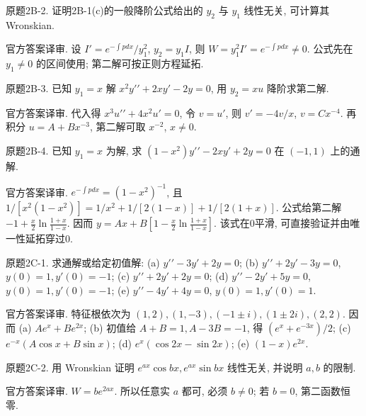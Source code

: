 \begin{exercise}\label{cw:bank-2B-2}
原题2B-2. 证明2B-1(c)的一般降阶公式给出的 $y_2$ 与 $y_1$ 线性无关, 可计算其 Wronskian.
\end{exercise}
\begin{solution}
官方答案译审. 设 $I\prime=e^{-\int p dx}/y_1^2$, $y_2=y_1I$, 则 $W=y_1^2I\prime=e^{-\int p dx}\ne0$. 公式先在 $y_1\ne0$ 的区间使用; 第二解可按正则方程延拓.
\end{solution}
\begin{exercise}\label{cw:bank-2B-3}
原题2B-3. 已知 $y_1=x$ 解 $x^2y\prime\prime+2xy\prime-2y=0$, 用 $y_2=xu$ 降阶求第二解.
\end{exercise}
\begin{solution}
官方答案译审. 代入得 $x^3u\prime\prime+4x^2u\prime=0$, 令 $v=u\prime$, 则 $v\prime=-4v/x$, $v=Cx^{-4}$. 再积分 $u=A+Bx^{-3}$, 第二解可取 $x^{-2}$, $x\ne0$.
\end{solution}
\begin{exercise}\label{cw:bank-2B-4}
原题2B-4. 已知 $y_1=x$ 为解, 求 $(1-x^2)y\prime\prime-2xy\prime+2y=0$ 在 $(-1,1)$ 上的通解.
\end{exercise}
\begin{solution}
官方答案译审. $e^{-\int p dx}=(1-x^2)^{-1}$, 且 $1/[x^2(1-x^2)]=1/x^2+1/[2(1-x)]+1/[2(1+x)]$. 公式给第二解 $-1+\frac{x}{2}\ln\frac{1+x}{1-x}$. 因而 $y=Ax+B[1-\frac{x}{2}\ln\frac{1+x}{1-x}]$. 该式在0平滑, 可直接验证并由唯一性延拓穿过0.
\end{solution}
\begin{exercise}\label{cw:bank-2C-1}
原题2C-1. 求通解或给定初值解: (a) $y\prime\prime-3y\prime+2y=0$; (b) $y\prime\prime+2y\prime-3y=0$, $y(0)=1,y\prime(0)=-1$; (c) $y\prime\prime+2y\prime+2y=0$; (d) $y\prime\prime-2y\prime+5y=0$, $y(0)=1,y\prime(0)=-1$; (e) $y\prime\prime-4y\prime+4y=0$, $y(0)=1,y\prime(0)=1$.
\end{exercise}
\begin{solution}
官方答案译审. 特征根依次为 $(1,2),(1,-3),(-1\pm i),(1\pm2i),(2,2)$. 因而 (a) $Ae^x+Be^{2x}$; (b) 初值给 $A+B=1,A-3B=-1$, 得 $(e^x+e^{-3x})/2$; (c) $e^{-x}(A\cos x+B\sin x)$; (d) $e^x(\cos2x-\sin2x)$; (e) $(1-x)e^{2x}$.
\end{solution}
\begin{exercise}\label{cw:bank-2C-2}
原题2C-2. 用 Wronskian 证明 $e^{ax}\cos bx,e^{ax}\sin bx$ 线性无关, 并说明 $a,b$ 的限制.
\end{exercise}
\begin{solution}
官方答案译审. $W=be^{2ax}$. 所以任意实 $a$ 都可, 必须 $b\ne0$; 若 $b=0$, 第二函数恒零.
\end{solution}
